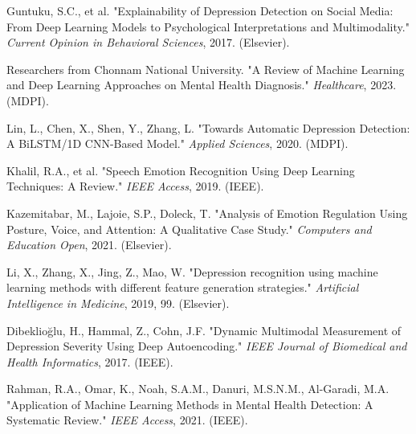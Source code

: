 \documentclass{article}
\begin{document}
\begin{enumerate}[label={[\arabic*]}, leftmargin=*]
    \item \label{ref:guntuku} Guntuku, S.C., et al. "Explainability of Depression Detection on Social Media: From Deep Learning Models to Psychological Interpretations and Multimodality." \emph{Current Opinion in Behavioral Sciences}, 2017. (Elsevier).
    \item \label{ref:from} Researchers from Chonnam National University. "A Review of Machine Learning and Deep Learning Approaches on Mental Health Diagnosis." \emph{Healthcare}, 2023. (MDPI).
    \item \label{ref:lin} Lin, L., Chen, X., Shen, Y., Zhang, L. "Towards Automatic Depression Detection: A BiLSTM/1D CNN-Based Model." \emph{Applied Sciences}, 2020. (MDPI).
    \item \label{ref:khali} Khalil, R.A., et al. "Speech Emotion Recognition Using Deep Learning Techniques: A Review." \emph{IEEE Access}, 2019. (IEEE).
    \item \label{ref:kazemitabar} Kazemitabar, M., Lajoie, S.P., Doleck, T. "Analysis of Emotion Regulation Using Posture, Voice, and Attention: A Qualitative Case Study." \emph{Computers and Education Open}, 2021. (Elsevier).
    \item \label{ref:li} Li, X., Zhang, X., Jing, Z., Mao, W. "Depression recognition using machine learning methods with different feature generation strategies." \emph{Artificial Intelligence in Medicine}, 2019, 99. (Elsevier).
    \item \label{ref:dibeklioğlu} Dibeklioğlu, H., Hammal, Z., Cohn, J.F. "Dynamic Multimodal Measurement of Depression Severity Using Deep Autoencoding." \emph{IEEE Journal of Biomedical and Health Informatics}, 2017. (IEEE).
    \item \label{ref:rahman} Rahman, R.A., Omar, K., Noah, S.A.M., Danuri, M.S.N.M., Al-Garadi, M.A. "Application of Machine Learning Methods in Mental Health Detection: A Systematic Review." \emph{IEEE Access}, 2021. (IEEE).
\end{enumerate}
\end{document}
